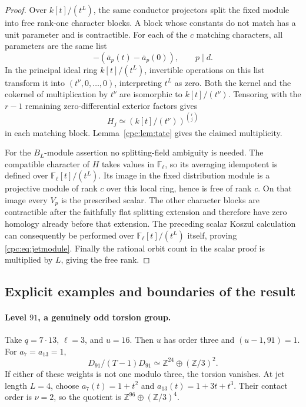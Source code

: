 \documentclass[11pt,a4paper]{article}
\numberwithin{equation}{section}
\theoremstyle{definition}
\theoremstyle{remark}
\begin{document}
\begin{proof}
Over $k[t]/(t^L)$, the same conductor projectors split the fixed
module into free rank-one character blocks. A block whose constants
do not match has a unit parameter and is contractible. For each of
the $c$ matching characters, all parameters are the same list
\[
 -(\overline a_p(t)-\overline a_p(0)),\qquad p\mid d.
\]
In the principal ideal ring $k[t]/(t^L)$, invertible operations on
this list transform it into $(t^\nu,0,\ldots,0)$, interpreting
$t^L$ as zero. Both the kernel and the cokernel of multiplication
by $t^\nu$ are isomorphic to $k[t]/(t^\nu)$. Tensoring with the
$r-1$ remaining zero-differential exterior factors gives
\[
 H_j\simeq
 \left(k[t]/(t^\nu)\right)^{\binom rj}
\]
in each matching block. Lemma~\ref{cpc:lem:tate} gives the claimed
multiplicity.

For the $B_L$-module assertion no splitting-field ambiguity is
needed. The compatible character of $H$ takes values in
$\mathbb F_\ell$, so its averaging idempotent is defined over
$\mathbb F_\ell[t]/(t^L)$. Its image in the fixed distribution
module is a projective module of rank $c$ over this local ring,
hence is free of rank $c$. On that image every $V_p$ is the
prescribed scalar. The other character blocks are contractible
after the faithfully flat splitting extension and therefore have
zero homology already before that extension. The preceding scalar
Koszul calculation can consequently be performed over
$\mathbb F_\ell[t]/(t^L)$ itself, proving
\eqref{cpc:eq:jetmodule}. Finally the rational orbit count in the
scalar proof is multiplied by $L$, giving the free rank.
\end{proof}

\subsection{Explicit examples and boundaries of the result}

\paragraph{Level $91$, a genuinely odd torsion group.}
Take $q=7\cdot13$, $\ell=3$, and $u=16$. Then $u$ has order three
and $(u-1,91)=1$. For $a_7=a_{13}=1$,
\[
 D_{91}/(T-1)D_{91}\simeq\mathbb Z^{24}\oplus(\mathbb Z/3)^2.
\]
If either of these weights is not one modulo three, the torsion
vanishes. At jet length $L=4$, choose
$a_7(t)=1+t^2$ and $a_{13}(t)=1+3t+t^3$. Their contact order is
$\nu=2$, so the quotient is
$\mathbb Z^{96}\oplus(\mathbb Z/3)^4$.
\end{document}
